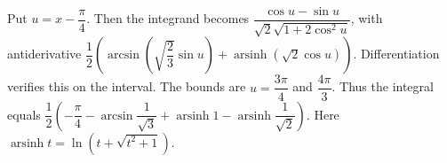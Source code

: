 Put $u=x-\dfrac{\pi}{4}$. Then the integrand becomes $\dfrac{\cos u-\sin u}{\sqrt2\sqrt{1+2\cos^2u}}$, with antiderivative $\dfrac{1}{2}\left(\arcsin(\sqrt{\dfrac{2}{3}}\sin u)+\operatorname{arsinh}(\sqrt2\cos u)\right)$. Differentiation verifies this on the interval. The bounds are $u = \dfrac{3 \pi}{4}$ and $\dfrac{4 \pi}{3}$. Thus the integral equals $\boxed{\dfrac{1}{2}\left(-\dfrac{\pi}{4}-\arcsin\dfrac{1}{\sqrt3}+\operatorname{arsinh}1-\operatorname{arsinh}\dfrac{1}{\sqrt2}\right)}$. Here $\operatorname{arsinh}t=\ln(t+\sqrt{t^2+1})$.
